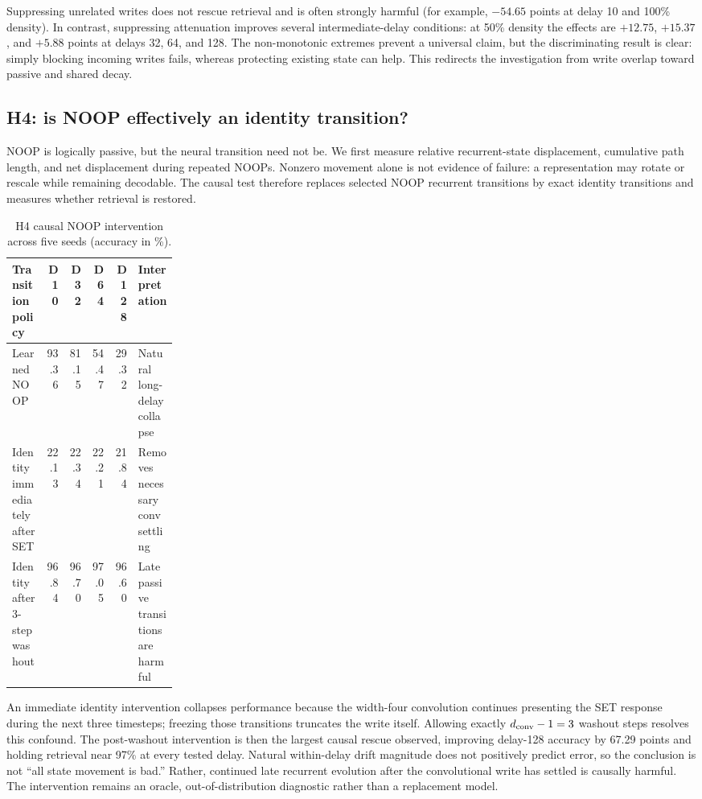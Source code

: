 \documentclass[10pt,a4paper]{article}
\begin{document}
Suppressing unrelated writes does not rescue retrieval and is often strongly harmful (for example, \(-54.65\) points at delay 10 and 100\% density). In contrast, suppressing attenuation improves several intermediate-delay conditions: at 50\% density the effects are \(+12.75\), \(+15.37\), and \(+5.88\) points at delays 32, 64, and 128. The non-monotonic extremes prevent a universal claim, but the discriminating result is clear: simply blocking incoming writes fails, whereas protecting existing state can help. This redirects the investigation from write overlap toward passive and shared decay.

\subsection{H4: is NOOP effectively an identity transition?}
NOOP is logically passive, but the neural transition need not be. We first measure relative recurrent-state displacement, cumulative path length, and net displacement during repeated NOOPs. Nonzero movement alone is not evidence of failure: a representation may rotate or rescale while remaining decodable. The causal test therefore replaces selected NOOP recurrent transitions by exact identity transitions and measures whether retrieval is restored.

\begin{table}[!htbp]
\centering\small
\caption{H4 causal NOOP intervention across five seeds (accuracy in \%).}
\begin{tabular}{lrrrrp{0.24\linewidth}}
\toprule
Transition policy & D10 & D32 & D64 & D128 & Interpretation \\
\midrule
Learned NOOP & 93.36 & 81.15 & 54.47 & 29.32 & Natural long-delay collapse \\
Identity immediately after SET & 22.13 & 22.34 & 22.21 & 21.84 & Removes necessary conv settling \\
Identity after 3-step washout & \cellcolor{softgreen}96.84 & \cellcolor{softgreen}96.70 & \cellcolor{softgreen}97.05 & \cellcolor{softgreen}96.60 & Late passive transitions are harmful \\
\bottomrule
\end{tabular}
\end{table}
An immediate identity intervention collapses performance because the width-four convolution continues presenting the SET response during the next three timesteps; freezing those transitions truncates the write itself. Allowing exactly \(d_{\rm conv}-1=3\) washout steps resolves this confound. The post-washout intervention is then the largest causal rescue observed, improving delay-128 accuracy by 67.29 points and holding retrieval near 97\% at every tested delay. Natural within-delay drift magnitude does not positively predict error, so the conclusion is not ``all state movement is bad.'' Rather, continued late recurrent evolution after the convolutional write has settled is causally harmful. The intervention remains an oracle, out-of-distribution diagnostic rather than a replacement model.
\end{document}
